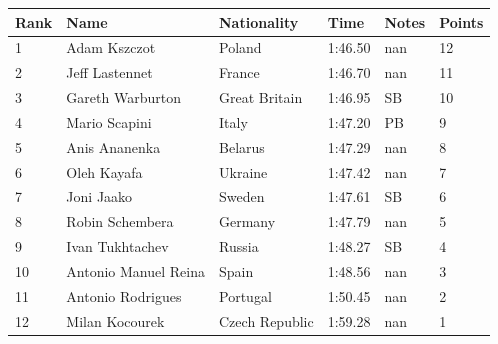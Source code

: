 \documentclass{article}
\begin{document}
\begin{tabular}{llllll}
\toprule
Rank & Name & Nationality & Time & Notes & Points \\
\midrule
1 & Adam Kszczot & Poland & 1:46.50 & nan & 12 \\
2 & Jeff Lastennet & France & 1:46.70 & nan & 11 \\
3 & Gareth Warburton & Great Britain & 1:46.95 & SB & 10 \\
4 & Mario Scapini & Italy & 1:47.20 & PB & 9 \\
5 & Anis Ananenka & Belarus & 1:47.29 & nan & 8 \\
6 & Oleh Kayafa & Ukraine & 1:47.42 & nan & 7 \\
7 & Joni Jaako & Sweden & 1:47.61 & SB & 6 \\
8 & Robin Schembera & Germany & 1:47.79 & nan & 5 \\
9 & Ivan Tukhtachev & Russia & 1:48.27 & SB & 4 \\
10 & Antonio Manuel Reina & Spain & 1:48.56 & nan & 3 \\
11 & Antonio Rodrigues & Portugal & 1:50.45 & nan & 2 \\
12 & Milan Kocourek & Czech Republic & 1:59.28 & nan & 1 \\
\bottomrule
\end{tabular}
\end{document}
